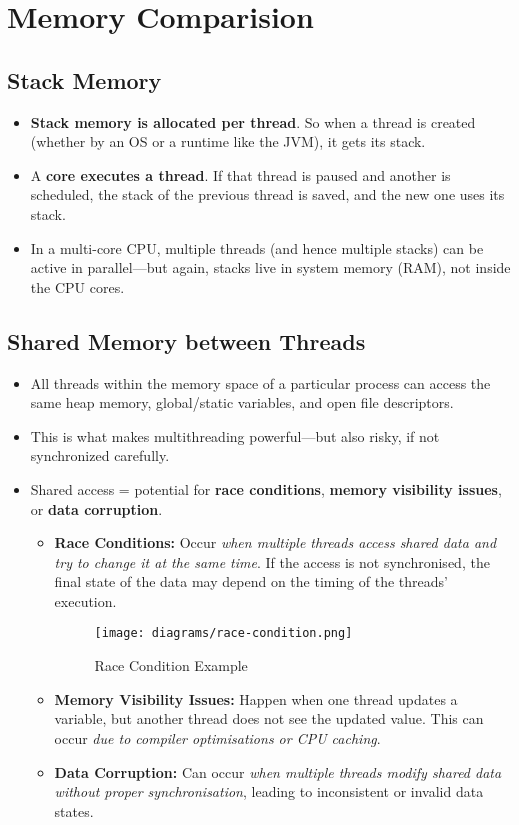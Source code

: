 \documentclass{article}
\begin{document}
\section{Memory Comparision}
\subsection{Stack Memory}
\begin{itemize}
  \item \textbf{Stack memory is allocated per thread}. So when a thread is created (whether by an OS or a runtime like the JVM), it gets its stack.
  \item A \textbf{core executes a thread}. If that thread is paused and another is scheduled, the stack of the previous thread is saved, and the new one uses its stack.
  \item In a multi-core CPU, multiple threads (and hence multiple stacks) can be active in parallel—but again, stacks live in system memory (RAM), not inside the CPU cores.
\end{itemize}
\subsection{Shared Memory between Threads}
\begin{itemize}
  \item All threads within the memory space of a particular process can access the same heap memory, global/static variables, and open file descriptors.
  \item This is what makes multithreading powerful—but also risky, if not synchronized carefully.
  \item Shared access = potential for \textbf{race conditions}, \textbf{memory visibility issues}, or \textbf{data corruption}.
  \begin{itemize}
    \item \textbf{Race Conditions:} Occur \textit{when multiple threads access shared data and try to change it at the same time}. If the access is not synchronised, the final state of the data may depend on the timing of the threads' execution.
    \begin{figure}[h]
      \centering
      \texttt{[image: diagrams/race-condition.png]}
      \caption{Race Condition Example}\label{fig:race_condition}
    \end{figure}
    \item \textbf{Memory Visibility Issues:} Happen when one thread updates a variable, but another thread does not see the updated value. This can occur \textit{due to compiler optimisations or CPU caching}.
    \item \textbf{Data Corruption:} Can occur \textit{when multiple threads modify shared data without proper synchronisation}, leading to inconsistent or invalid data states.
  \end{itemize}
\end{itemize}
\end{document}
